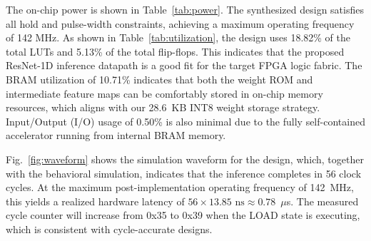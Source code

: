 \documentclass[conference]{IEEEtran}
\begin{document}
The on-chip power is shown in Table~\ref{tab:power}.
The synthesized design satisfies all hold and pulse-width constraints, achieving a maximum operating frequency of 142 MHz. As shown in Table~\ref{tab:utilization}, the design uses 18.82\% of the total LUTs and 5.13\% of the total flip-flops. This indicates that the proposed ResNet-1D inference datapath is a good fit for the target FPGA logic fabric. The BRAM utilization of 10.71\% indicates that both the weight ROM and intermediate feature maps can be comfortably stored in on-chip memory resources, which aligns with our 28.6~KB INT8 weight storage strategy. Input/Output (I/O) usage of 0.50\% is also minimal due to the fully self-contained accelerator running from internal BRAM memory.


Fig.~\ref{fig:waveform} shows the simulation waveform for the design, which, together with the behavioral simulation, indicates that the inference completes in 56 clock cycles. At the maximum post-implementation operating frequency of 142~MHz, this yields a realized hardware latency of $56 \times 13.85\text{~ns} \approx 0.78$~$\mu$s. The measured cycle counter will increase from 0x35 to 0x39 when the LOAD state is executing, which is consistent with cycle-accurate designs.
\end{document}

